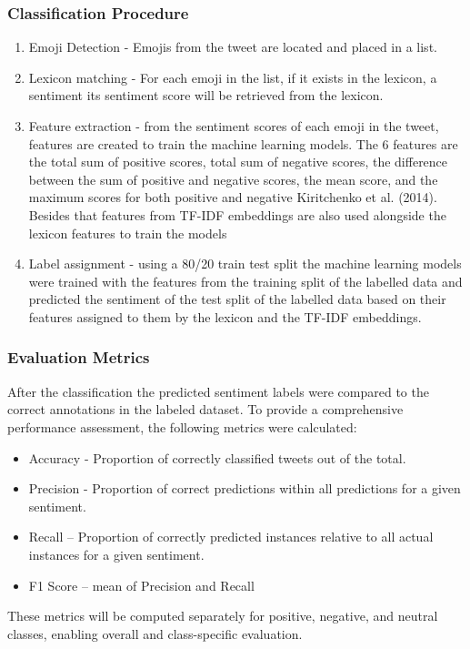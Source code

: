 \subsubsection{Classification Procedure}
\begin{enumerate}
	\item Emoji Detection - Emojis from the tweet are located and placed in a list.
	\item Lexicon matching - For each emoji in the list, if it exists in the lexicon, a sentiment its sentiment score will be retrieved from the lexicon.
	\item Feature extraction - from the sentiment scores of each emoji in the tweet, features are created to train the machine learning models. The 6 features are the total sum of positive scores, total sum of negative scores, the difference between the sum of positive and negative scores, the mean score, and the maximum scores for both positive and negative Kiritchenko et al. (2014). Besides that features from TF-IDF embeddings are also used alongside the lexicon features to train the models
	\item Label assignment - using a 80/20 train test split the machine learning models were trained with the features from the training split of the labelled data and predicted the sentiment of the test split of the labelled data based on their features assigned to them by the lexicon and the TF-IDF embeddings.
\end{enumerate}

\subsubsection{Evaluation Metrics}

After the classification the predicted sentiment labels were compared to the correct annotations in the labeled dataset. To provide a comprehensive performance assessment, the following metrics were calculated:

\begin{itemize}
	\item Accuracy - Proportion of correctly classified tweets out of the total.
	\item Precision - Proportion of correct predictions within all predictions for a given sentiment.
	\item Recall – Proportion of correctly predicted instances relative to all actual instances for a given sentiment.
	\item F1 Score – mean of Precision and Recall
\end{itemize}

These metrics will be computed separately for positive, negative, and neutral classes, enabling overall and class-specific evaluation.

